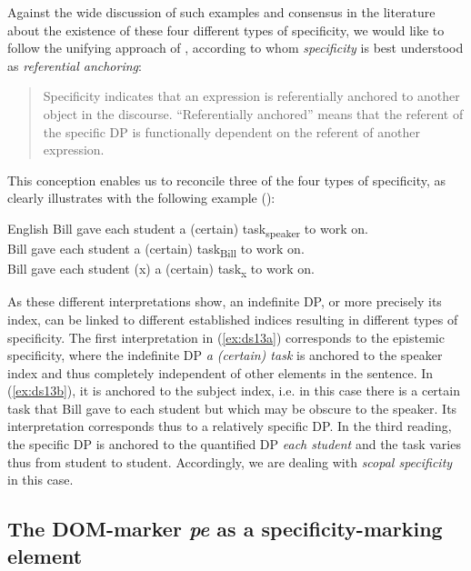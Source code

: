\documentclass[output=paper,colorlinks,citecolor=brown]{langscibook}
\begin{document}
Against the wide discussion of such examples and consensus in the literature about the existence of these four different types of specificity, we would like to follow the unifying approach of \citet{Heusinger2002}, according to whom \textit{specificity} is best understood as \textit{referential anchoring}:

\begin{quote}
Specificity indicates that an expression is referentially anchored to another object in the discourse. “Referentially anchored” means that the referent of the specific DP is functionally dependent on the referent of another expression.\hfill\hbox{\citep[268]{Heusinger2002}}
\end{quote}

This conception enables us to reconcile three of the four types of specificity, as \citeauthor{Heusinger2002} clearly illustrates with the following example (\citeyear[269]{Heusinger2002}):

\ea\label{ex:ds13} English
    \ea\label{ex:ds13a} Bill gave each student a (certain) task\textsubscript{speaker} to work on.\\
    \ex\label{ex:ds13b} Bill gave each student a (certain) task\textsubscript{Bill} to work on.\\
    \ex\label{ex:ds13c} Bill gave each student (x) a (certain) task\textsubscript{x} to work on.\\
\z
\z

As these different interpretations show, an indefinite DP, or more precisely its index, can be linked to different established indices resulting in different types of specificity. The first interpretation in (\ref{ex:ds13a}) corresponds to the epistemic specificity, where the indefinite DP \textit{a (certain) task} is anchored to the speaker index and thus completely independent of other elements in the sentence. In (\ref{ex:ds13b}), it is anchored to the subject index, i.e. in this case there is a certain task that Bill gave to each student but which may be obscure to the speaker. Its interpretation corresponds thus to a relatively specific DP. In the third reading, the specific DP is anchored to the quantified DP \textit{each student} and the task varies thus from student to student. Accordingly, we are dealing with \textit{scopal specificity} in this case.

\subsection{The DOM-marker \textit{pe} as a specificity-marking element}\label{sec:ds2.4}
\end{document}
